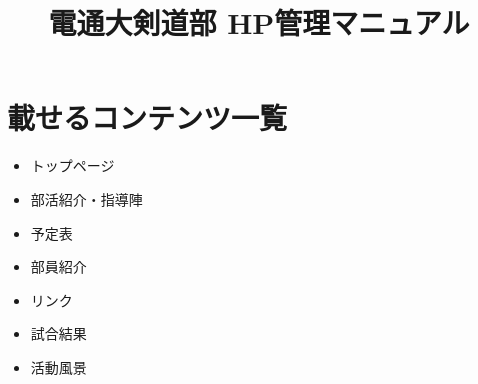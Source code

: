 \documentclass[10pt]{jsarticle}
\title{電通大剣道部 HP管理マニュアル}
\begin{document}
\maketitle


\section{載せるコンテンツ一覧}
\begin{itemize}
	\item トップページ
	\item 部活紹介・指導陣
	\item 予定表
	\item 部員紹介
	\item リンク
	\item 試合結果
	\item 活動風景
\end{itemize}
\end{document}
